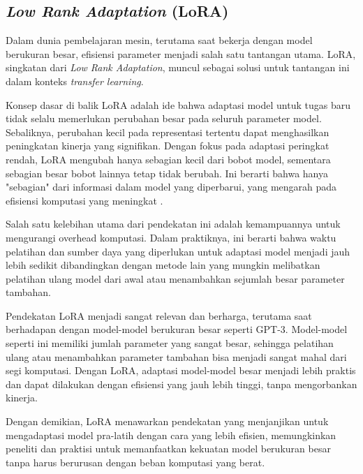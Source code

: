 \subsection{\textit{Low Rank Adaptation} (LoRA)}

Dalam dunia pembelajaran mesin, terutama saat bekerja dengan model berukuran besar, efisiensi parameter menjadi salah satu tantangan utama. LoRA, singkatan dari \textit{Low Rank Adaptation}, muncul sebagai solusi untuk tantangan ini dalam konteks \textit{transfer learning}.

Konsep dasar di balik LoRA adalah ide bahwa adaptasi model untuk tugas baru tidak selalu memerlukan perubahan besar pada seluruh parameter model. Sebaliknya, perubahan kecil pada representasi tertentu dapat menghasilkan peningkatan kinerja yang signifikan. Dengan fokus pada adaptasi peringkat rendah, LoRA mengubah hanya sebagian kecil dari bobot model, sementara sebagian besar bobot lainnya tetap tidak berubah. Ini berarti bahwa hanya "sebagian" dari informasi dalam model yang diperbarui, yang mengarah pada efisiensi komputasi yang meningkat \parencite{lora}.

Salah satu kelebihan utama dari pendekatan ini adalah kemampuannya untuk mengurangi overhead komputasi. Dalam praktiknya, ini berarti bahwa waktu pelatihan dan sumber daya yang diperlukan untuk adaptasi model menjadi jauh lebih sedikit dibandingkan dengan metode lain yang mungkin melibatkan pelatihan ulang model dari awal atau menambahkan sejumlah besar parameter tambahan.

Pendekatan LoRA menjadi sangat relevan dan berharga, terutama saat berhadapan dengan model-model berukuran besar seperti GPT-3. Model-model seperti ini memiliki jumlah parameter yang sangat besar, sehingga pelatihan ulang atau menambahkan parameter tambahan bisa menjadi sangat mahal dari segi komputasi. Dengan LoRA, adaptasi model-model besar menjadi lebih praktis dan dapat dilakukan dengan efisiensi yang jauh lebih tinggi, tanpa mengorbankan kinerja.

Dengan demikian, LoRA menawarkan pendekatan yang menjanjikan untuk mengadaptasi model pra-latih dengan cara yang lebih efisien, memungkinkan peneliti dan praktisi untuk memanfaatkan kekuatan model berukuran besar tanpa harus berurusan dengan beban komputasi yang berat.